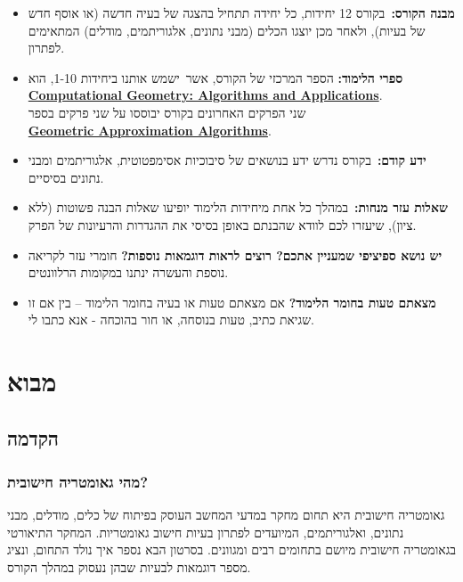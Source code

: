 \documentclass[
]{book}
\begin{document}
\begin{itemize}
\item
  \textbf{מבנה הקורס:}~בקורס 12 יחידות, כל יחידה תתחיל בהצגה של בעיה חדשה (או אוסף חדש של בעיות), ולאחר מכן יוצגו הכלים (מבני נתונים, אלגוריתמים, מודלים) המתאימים לפתרון.
\item
  \textbf{ספרי הלימוד:} הספר המרכזי של הקורס, אשר~ישמש אותנו ביחידות 1-10, הוא~\\
  \href{http://www.cs.uu.nl/geobook/}{\textbf{Computational Geometry: Algorithms and Applications}}.\\
  שני הפרקים האחרונים בקורס יבוססו על שני פרקים בספר\\
  \href{https://sarielhp.org/book/}{\textbf{Geometric Approximation Algorithms}}.
\item
  \textbf{ידע קודם:}~בקורס נדרש ידע בנושאים של סיבוכיות אסימפטוטית, אלגוריתמים ומבני נתונים בסיסיים.
\item
  \textbf{שאלות עזר מנחות:}~במהלך כל אחת מיחידות הלימוד יופיעו שאלות הבנה פשוטות (ללא ציון), שיעזרו לכם לוודא שהבנתם באופן בסיסי את ההגדרות והרעיונות של הפרק.
\item
  \textbf{יש נושא ספיציפי שמעניין אתכם? רוצים לראות דוגמאות נוספות?} חומרי עזר לקריאה נוספת והעשרה ינתנו במקומות הרלוונטים.~
\item
  \textbf{מצאתם טעות בחומר הלימוד?} אם מצאתם טעות או בעיה בחומר הלימוד -- בין אם זו שגיאת כתיב, טעות בנוסחה, או חור בהוכחה - אנא כתבו לי.
\end{itemize}

\hypertarget{intro}{%
\chapter{מבוא}\label{intro}}

\hypertarget{preface}{%
\section{הקדמה}\label{preface}}

\hypertarget{what-is-cg}{%
\subsection{מהי גאומטריה חישובית?}\label{what-is-cg}}

גאומטריה חישובית היא תחום מחקר במדעי המחשב העוסק בפיתוח של כלים, מודלים, מבני נתונים, ואלגוריתמים, המיועדים לפתרון בעיות חישוב גאומטריות. המחקר התיאורטי בגאומטריה חישובית מיושם בתחומים רבים ומגוונים. בסרטון הבא נספר איך נולד התחום, ונציג מספר דוגמאות לבעיות שבהן נעסוק במהלך הקורס.
\end{document}
